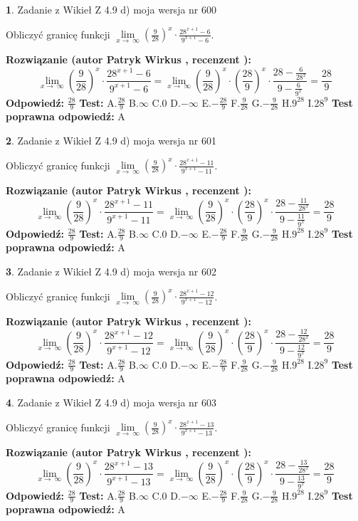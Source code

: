 \documentclass[12pt, a4paper]{article}
\theoremstyle{definition} %
\newtheorem{zad}{}
\newcommand{\zadStart}[1]{\begin{zad}#1\newline}
\newcommand{\zadStop}{\end{zad}}
\newcommand{\rozwStart}[2]{\noindent \textbf{Rozwiązanie (autor #1 , recenzent #2): }\newline}
\newcommand{\rozwStop}{\newline}
\newcommand{\odpStart}{\noindent \textbf{Odpowiedź:}\newline}
\newcommand{\odpStop}{\newline}
\newcommand{\testStart}{\noindent \textbf{Test:}\newline}
\newcommand{\testStop}{\newline}
\newcommand{\kluczStart}{\noindent \textbf{Test poprawna odpowiedź:}\newline}
\newcommand{\kluczStop}{\newline}
\begin{document}
\zadStart{Zadanie z Wikieł Z 4.9 d) moja wersja nr 600}


Obliczyć granicę funkcji  $\lim\limits_{x\to\ \infty}(\frac{9}{28})^{x}\cdot\frac{28^{x+1}-6}{9^{x+1}-6}$.
\zadStop
\rozwStart{Patryk Wirkus}{}
$$\lim\limits_{x\to\ \infty}(\frac{9}{28})^{x}\cdot\frac{28^{x+1}-6}{9^{x+1}-6}=\lim\limits_{x\to\ \infty}(\frac{9}{28})^{x}\cdot(\frac{28}{9})^{x} \cdot \frac{28-\frac{6}{28^{x}}}{9-\frac{6}{9^{x}}} = \frac{28}{9}$$
\rozwStop
\odpStart
$\frac{28}{9}$
\odpStop
\testStart
A.$\frac{28}{9}$ B.$\infty$ C.$0$ D.$-\infty$ E.$-\frac{28}{9}$
F.$\frac{9}{28}$ G.$-\frac{9}{28}$
H.$9^{28}$
I.$28^{9}$
\testStop
\kluczStart
A
\kluczStop



\zadStart{Zadanie z Wikieł Z 4.9 d) moja wersja nr 601}


Obliczyć granicę funkcji  $\lim\limits_{x\to\ \infty}(\frac{9}{28})^{x}\cdot\frac{28^{x+1}-11}{9^{x+1}-11}$.
\zadStop
\rozwStart{Patryk Wirkus}{}
$$\lim\limits_{x\to\ \infty}(\frac{9}{28})^{x}\cdot\frac{28^{x+1}-11}{9^{x+1}-11}=\lim\limits_{x\to\ \infty}(\frac{9}{28})^{x}\cdot(\frac{28}{9})^{x} \cdot \frac{28-\frac{11}{28^{x}}}{9-\frac{11}{9^{x}}} = \frac{28}{9}$$
\rozwStop
\odpStart
$\frac{28}{9}$
\odpStop
\testStart
A.$\frac{28}{9}$ B.$\infty$ C.$0$ D.$-\infty$ E.$-\frac{28}{9}$
F.$\frac{9}{28}$ G.$-\frac{9}{28}$
H.$9^{28}$
I.$28^{9}$
\testStop
\kluczStart
A
\kluczStop



\zadStart{Zadanie z Wikieł Z 4.9 d) moja wersja nr 602}


Obliczyć granicę funkcji  $\lim\limits_{x\to\ \infty}(\frac{9}{28})^{x}\cdot\frac{28^{x+1}-12}{9^{x+1}-12}$.
\zadStop
\rozwStart{Patryk Wirkus}{}
$$\lim\limits_{x\to\ \infty}(\frac{9}{28})^{x}\cdot\frac{28^{x+1}-12}{9^{x+1}-12}=\lim\limits_{x\to\ \infty}(\frac{9}{28})^{x}\cdot(\frac{28}{9})^{x} \cdot \frac{28-\frac{12}{28^{x}}}{9-\frac{12}{9^{x}}} = \frac{28}{9}$$
\rozwStop
\odpStart
$\frac{28}{9}$
\odpStop
\testStart
A.$\frac{28}{9}$ B.$\infty$ C.$0$ D.$-\infty$ E.$-\frac{28}{9}$
F.$\frac{9}{28}$ G.$-\frac{9}{28}$
H.$9^{28}$
I.$28^{9}$
\testStop
\kluczStart
A
\kluczStop



\zadStart{Zadanie z Wikieł Z 4.9 d) moja wersja nr 603}


Obliczyć granicę funkcji  $\lim\limits_{x\to\ \infty}(\frac{9}{28})^{x}\cdot\frac{28^{x+1}-13}{9^{x+1}-13}$.
\zadStop
\rozwStart{Patryk Wirkus}{}
$$\lim\limits_{x\to\ \infty}(\frac{9}{28})^{x}\cdot\frac{28^{x+1}-13}{9^{x+1}-13}=\lim\limits_{x\to\ \infty}(\frac{9}{28})^{x}\cdot(\frac{28}{9})^{x} \cdot \frac{28-\frac{13}{28^{x}}}{9-\frac{13}{9^{x}}} = \frac{28}{9}$$
\rozwStop
\odpStart
$\frac{28}{9}$
\odpStop
\testStart
A.$\frac{28}{9}$ B.$\infty$ C.$0$ D.$-\infty$ E.$-\frac{28}{9}$
F.$\frac{9}{28}$ G.$-\frac{9}{28}$
H.$9^{28}$
I.$28^{9}$
\testStop
\kluczStart
A
\kluczStop
\end{document}
